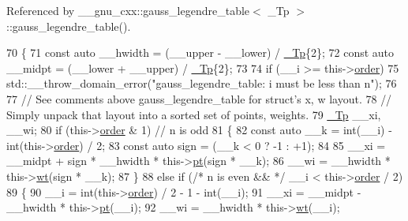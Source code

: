 Referenced by \+\_\+\+\_\+gnu\+\_\+cxx\+::gauss\+\_\+legendre\+\_\+table$<$ \+\_\+\+Tp $>$\+::gauss\+\_\+legendre\+\_\+table().


\begin{DoxyCode}
70     \{
71       \textcolor{keyword}{const} \textcolor{keyword}{auto} \_\_hwidth = (\_\_upper - \_\_lower) / \hyperlink{namespace____gnu__cxx_a3b19a9c800ca194374ef9172290f7d79}{\_Tp}\{2\};
72       \textcolor{keyword}{const} \textcolor{keyword}{auto} \_\_midpt = (\_\_lower + \_\_upper) / \hyperlink{namespace____gnu__cxx_a3b19a9c800ca194374ef9172290f7d79}{\_Tp}\{2\};
73 
74       \textcolor{keywordflow}{if} (\_\_i >= this->\hyperlink{struct____gnu__cxx_1_1gauss__legendre__table_aecdc9cdb90f5a7b4f06a455cd868370f}{order})
75         std::\_\_throw\_domain\_error(\textcolor{stringliteral}{"gauss\_legendre\_table: i must be less than n"});
76 
77       \textcolor{comment}{// See comments above gauss\_legendre\_table for struct's x, w layout.}
78       \textcolor{comment}{// Simply unpack that layout into a sorted set of points, weights.}
79       \hyperlink{namespace____gnu__cxx_a3b19a9c800ca194374ef9172290f7d79}{\_Tp} \_\_xi, \_\_wi;
80       \textcolor{keywordflow}{if} (this->\hyperlink{struct____gnu__cxx_1_1gauss__legendre__table_aecdc9cdb90f5a7b4f06a455cd868370f}{order} & 1) \textcolor{comment}{// n is odd}
81         \{
82           \textcolor{keyword}{const} \textcolor{keyword}{auto} \_\_k = int(\_\_i) - int(this->\hyperlink{struct____gnu__cxx_1_1gauss__legendre__table_aecdc9cdb90f5a7b4f06a455cd868370f}{order}) / 2;
83           \textcolor{keyword}{const} \textcolor{keyword}{auto} sign = (\_\_k < 0 ? -1 : +1);
84 
85           \_\_xi = \_\_midpt + sign * \_\_hwidth * this->\hyperlink{struct____gnu__cxx_1_1gauss__legendre__table_a22c34439f95a9cd22e95e37442127f63}{pt}(sign * \_\_k);
86           \_\_wi =                  \_\_hwidth * this->\hyperlink{struct____gnu__cxx_1_1gauss__legendre__table_affd960260dce4c36ad22f9c34b411bc7}{wt}(sign * \_\_k);
87         \}
88       \textcolor{keywordflow}{else} \textcolor{keywordflow}{if} (\textcolor{comment}{/* n is even && */} \_\_i < this->\hyperlink{struct____gnu__cxx_1_1gauss__legendre__table_aecdc9cdb90f5a7b4f06a455cd868370f}{order} / 2)
89         \{
90           \_\_i = int(this->\hyperlink{struct____gnu__cxx_1_1gauss__legendre__table_aecdc9cdb90f5a7b4f06a455cd868370f}{order}) / 2 - 1 - int(\_\_i);
91           \_\_xi = \_\_midpt - \_\_hwidth * this->\hyperlink{struct____gnu__cxx_1_1gauss__legendre__table_a22c34439f95a9cd22e95e37442127f63}{pt}(\_\_i);
92           \_\_wi =           \_\_hwidth * this->\hyperlink{struct____gnu__cxx_1_1gauss__legendre__table_affd960260dce4c36ad22f9c34b411bc7}{wt}(\_\_i);

\end{DoxyCode}
